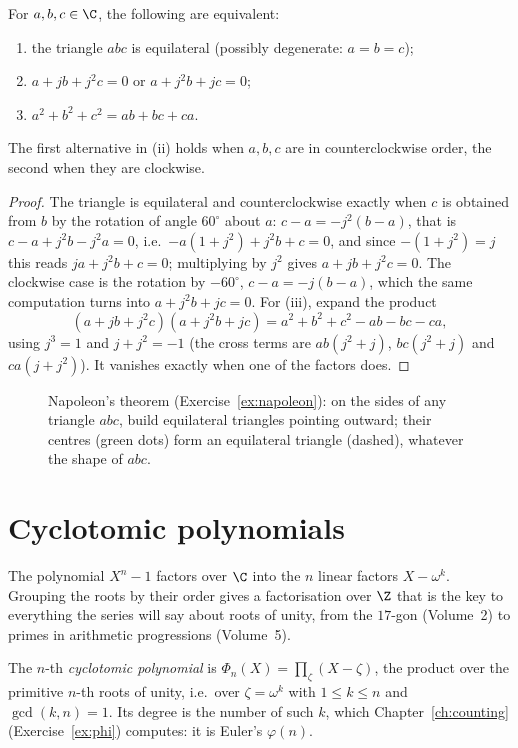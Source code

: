 \begin{proposition}\label{prop:equilateral}
For $a,b,c\in\C$, the following are equivalent:
\begin{enumerate}[label=(\roman*)]
\item the triangle $abc$ is equilateral (possibly degenerate: $a=b=c$);
\item $a+jb+j^2c=0$ or $a+j^2b+jc=0$;
\item $a^2+b^2+c^2=ab+bc+ca$.
\end{enumerate}
The first alternative in (ii) holds when $a,b,c$ are in counterclockwise order, the second when they are clockwise.
\end{proposition}
\begin{proof}
The triangle is equilateral and counterclockwise exactly when $c$ is obtained from $b$ by the rotation of angle $60^\circ$ about $a$:
$c-a=-j^2(b-a)$, that is $c-a+j^2b-j^2a=0$, i.e.\ $-a(1+j^2)+j^2b+c=0$, and since $-(1+j^2)=j$ this reads $ja+j^2b+c=0$; multiplying by $j^2$ gives $a+jb+j^2c=0$.
The clockwise case is the rotation by $-60^\circ$, $c-a=-j(b-a)$, which the same computation turns into $a+j^2b+jc=0$. For (iii), expand the product
\[
(a+jb+j^2c)(a+j^2b+jc)=a^2+b^2+c^2-ab-bc-ca,
\]
using $j^3=1$ and $j+j^2=-1$ (the cross terms are $ab(j^2+j)$, $bc(j^2+j)$ and $ca(j+j^2)$). It vanishes exactly when one of the factors does.
\end{proof}

\begin{figure}[ht]
\centering
{}
\caption{Napoleon's theorem (Exercise~\ref{ex:napoleon}): on the sides of any triangle $abc$, build equilateral triangles pointing outward; their centres (green dots) form an equilateral triangle (dashed), whatever the shape of $abc$.}
\label{fig:napoleon}
\end{figure}

\section{Cyclotomic polynomials}

The polynomial $X^n-1$ factors over $\C$ into the $n$ linear factors $X-\omega^k$. Grouping the roots by their order gives a factorisation over $\Z$
that is the key to everything the series will say about roots of unity, from the $17$-gon (Volume~2) to primes in arithmetic progressions (Volume~5).

\begin{definition}\label{def:cyclotomic}
The $n$-th \emph{cyclotomic polynomial} is $\Phi_n(X)=\prod_\zeta(X-\zeta)$, the product over the primitive $n$-th roots of unity, i.e.\ over
$\zeta=\omega^k$ with $1\le k\le n$ and $\gcd(k,n)=1$. Its degree is the number of such $k$, which Chapter~\ref{ch:counting} (Exercise~\ref{ex:phi}) computes: it is Euler's $\varphi(n)$.
\end{definition}

